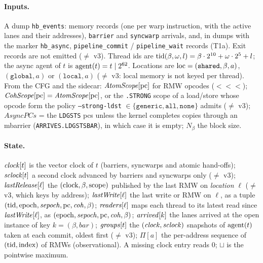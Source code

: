 \paragraph{Inputs.}
A dump \texttt{hb\_events}: memory records (one per warp instruction, with the active
lanes and their addresses), \texttt{barrier} and \texttt{syncwarp} arrivals, and, in dumps
with the marker \texttt{hb\_async}, \texttt{pipeline\_commit} / \texttt{pipeline\_wait}
records (T1a). Exit records are not emitted ($\ne$ v3). Thread ids are
$\operatorname{tid}(\beta,\omega,l)=\beta\cdot2^{10}+\omega\cdot2^{5}+l$; the async agent of $t$ is
$\operatorname{agent}(t)=t\mathrel{|}2^{62}$. Locations are
$\operatorname{loc}=(\texttt{shared},\beta,a)$, $(\texttt{global},a)$ or $(\texttt{local},a)$
($\ne$ v3: local memory is not keyed per thread). From the CFG and the sidecar:
$\mathit{AtomScope}[\operatorname{pc}]$ for RMW opcodes (\NONE$<$\WARP$<$\BLOCK$<$\GRID);
$\mathit{CohScope}[\operatorname{pc}]=\mathit{AtomScope}[\operatorname{pc}]$, or the \texttt{.STRONG} scope of a
load/store whose opcode form the policy \texttt{--strong-ldst}
$\in\{\texttt{generic},\texttt{all},\texttt{none}\}$ admits ($\ne$ v3);
$\mathit{AsyncPCs}$ = the \texttt{LDGSTS} pcs unless the kernel completes copies through an
mbarrier (\texttt{ARRIVES.LDGSTSBAR}), in which case it is empty; $N_\beta$ the block size.

\paragraph{State.}
$\mathit{clock}[t]$ is the vector clock of $t$ (barriers, syncwarps and atomic hand-offs);
$\mathit{sclock}[t]$ a second clock advanced by barriers and syncwarps only ($\ne$ v3);
$\mathit{lastRelease}[\ell]$ the $(\text{clock},\beta,\operatorname{scope})$ published by the last RMW on
\emph{location} $\ell$ ($\ne$ v3, which keys by address);
$\mathit{lastWrite}[\ell]$ the last write or RMW on $\ell$, as a tuple
$(\operatorname{tid},\operatorname{epoch},\mathit{sepoch},\operatorname{pc},\mathit{coh},\beta)$;
$\mathit{readers}[\ell]$ maps each thread to its latest read since $\mathit{lastWrite}[\ell]$, as
$(\operatorname{epoch},\mathit{sepoch},\operatorname{pc},\mathit{coh},\beta)$; $\mathit{arrived}[k]$ the lanes arrived at the open instance of key
$k=(\beta,\mathit{bar})$; $\mathit{groups}[t]$ the $(\mathit{clock},\mathit{sclock})$ snapshots of $\operatorname{agent}(t)$ taken at
each commit, oldest first ($\ne$ v3); $\Pi[a]$ the per-address sequence of
$(\operatorname{tid},\text{index})$ of RMWs (observational). A missing clock entry reads $0$;
$\sqcup$ is the pointwise maximum.


